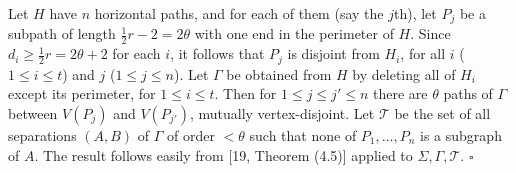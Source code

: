 Let $H$ have $n$ horizontal paths, and for each of them (say the $j$th), let $P_j$ be a subpath of length $\frac{1}{2}r - 2 = 2\theta$ with one end in the perimeter of $H$. Since $d_i \ge \frac{1}{2}r = 2\theta + 2$ for each $i$, it follows that $P_j$ is disjoint from $H_i$, for all $i$ ($1 \le i \le t$) and $j$ ($1 \le j \le n$). Let $\Gamma$ be obtained from $H$ by deleting all of $H_i$ except its perimeter, for $1 \le i \le t$. Then for $1 \le j \le j' \le n$ there are $\theta$ paths of $\Gamma$ between $V(P_j)$ and $V(P_{j'})$, mutually vertex-disjoint. Let $\mathscr{T}$ be the set of all separations $(A, B)$ of $\Gamma$ of order $< \theta$ such that none of $P_1, \dots, P_n$ is a subgraph of $A$. The result follows easily from [19, Theorem (4.5)] applied to $\Sigma, \Gamma, \mathscr{T}$. $\square$
